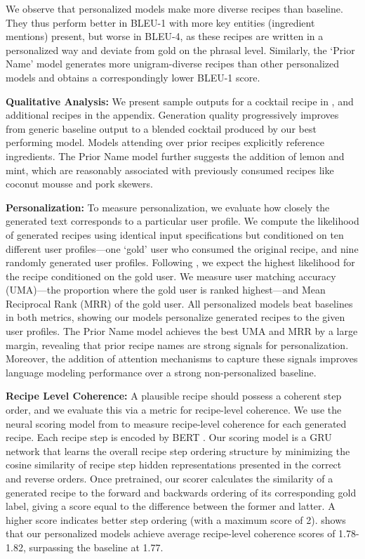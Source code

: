 \documentclass[11pt,a4paper]{article}
\begin{document}
We observe that personalized models make more diverse recipes than baseline. They thus perform better in BLEU-1 with more key entities (ingredient mentions) present, but worse in BLEU-4, as these recipes are written in a personalized way and deviate from gold on the phrasal level. Similarly, the `Prior Name' model generates more unigram-diverse recipes than other personalized models and obtains a correspondingly lower BLEU-1 score.
\medskip

\noindent
\textbf{Qualitative Analysis: }We present sample outputs for a cocktail recipe in , and additional recipes in the appendix.
Generation quality progressively improves from generic baseline output to a blended cocktail produced by our best performing model.
Models attending over prior recipes explicitly reference ingredients.
The Prior Name model further suggests the addition of lemon and mint,
which are reasonably associated with previously consumed recipes like coconut mousse and pork skewers.
\medskip

\noindent
\textbf{Personalization:} To measure personalization, we evaluate how closely the generated text corresponds to a particular user profile.
We compute the likelihood of generated recipes using identical input specifications but conditioned on ten different user profiles---one `gold' user who consumed the original recipe, and nine randomly generated user profiles.
Following \citet{DBLP:conf/acl/LewisDF18}, we expect the highest likelihood for the recipe conditioned on the gold user.
We measure user matching accuracy (UMA)---the proportion where the gold user is ranked highest---and Mean Reciprocal Rank (MRR) \cite{DBLP:conf/lrec/RadevQWF02} of the gold user.
All personalized models beat baselines in both metrics, showing our models personalize generated recipes to the given user profiles.
The Prior Name model achieves the best UMA and MRR by a large margin, revealing that prior recipe names are strong signals for personalization.
Moreover, the addition of attention mechanisms to capture these signals improves language modeling performance over a strong non-personalized baseline.
\medskip

\noindent
\textbf{Recipe Level Coherence:}
A plausible recipe should possess a coherent step order, and we evaluate this via a metric for recipe-level coherence.
We use the neural scoring model from \citet{DBLP:conf/naacl/BosselutCHGHC18} to measure recipe-level coherence for each generated recipe.
Each recipe step is encoded by BERT \cite{DBLP:conf/naacl/DevlinCLT19}.
Our scoring model is a GRU network that learns the overall recipe step ordering structure by minimizing the cosine similarity of recipe step hidden representations presented in the correct and reverse orders.
Once pretrained, our scorer calculates the similarity of a generated recipe to the forward and backwards ordering of its corresponding gold label, giving a score equal to the difference between the former and latter. A higher score indicates better step ordering (with a maximum score of 2).
 shows that our personalized models achieve average recipe-level coherence scores of 1.78-1.82, surpassing the baseline at 1.77.
\medskip
\end{document}
